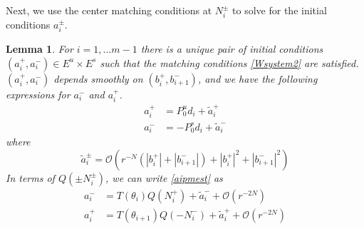 \documentclass[12pt]{article}
\newtheorem{lemma}{Lemma}
\begin{document}
Next, we use the center matching conditions at $N_i^\pm$ to solve for the initial conditions $a_i^\pm$.

\begin{lemma}\label{inv2}
For $i = 1, \dots m-1$ there is a unique pair of initial conditions $(a_i^+, a_i^-) \in E^u \times E^s$ such that the matching conditions \eqref{Wsystem2} are satisfied. $(a_i^+, a_i^-)$ depends smoothly on $(b_i^+, b_{i+1}^-)$, and we have the following expressions for $a_i^-$ and $a_i^+$. 
\begin{equation}\label{aipmest}
\begin{aligned}
a_i^+ &= P_0^u d_i + \tilde{a}_i^+ \\
a_i^- &= -P_0^s d_i + \tilde{a}_i^-
\end{aligned}
\end{equation}
where 
\begin{equation}\label{tildeaest}
\tilde{a}_i^\pm = \mathcal{O}(r^{-N}(|b_i^+|+|b_{i+1}^-|) + |b_i^+|^2+|b_{i+1}^-|^2) 
\end{equation}
In terms of $Q(\pm N_i^\pm)$, we can write \eqref{aipmest} as 
\begin{equation}\label{aipmexp}
\begin{aligned}
a_i^- &= T(\theta_i) Q(N_i^+) + \tilde{a}_i^- + \mathcal{O}(r^{-2N}) \\
a_i^+ &= T(\theta_{i+1}) Q(-N_i^-) + \tilde{a}_i^+ + \mathcal{O}(r^{-2N}) \\
\end{aligned}
\end{equation}


\end{lemma}
\end{document}
